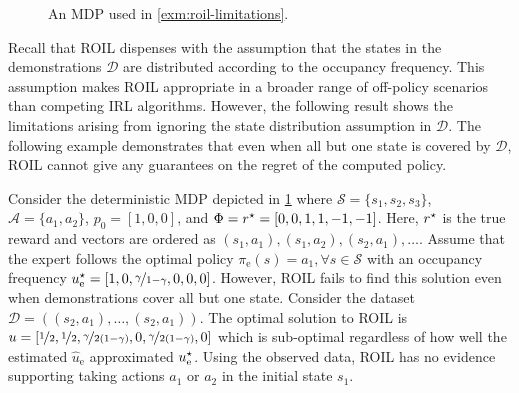 \begin{figure}
  \centering
{}
  \caption{An MDP used in \cref{exm:roil-limitations}.}
  \label{fig:roil-fail}
\end{figure}

Recall that ROIL dispenses with the assumption that the states in the demonstrations $\mathcal{D}$ are distributed according to the occupancy frequency. This assumption makes ROIL appropriate in a broader range of off-policy scenarios than competing IRL algorithms. However, the following result shows the limitations arising from ignoring the state distribution assumption in $\mathcal{D}$. The following example demonstrates that even when all but one state is covered by $\mathcal{D}$, ROIL cannot give any guarantees on the regret of the computed policy. 

\begin{example} \label{exm:roil-limitations}
Consider the deterministic MDP depicted in \cref{fig:roil-fail} where $\mathcal{S} = \{s_1, s_2, s_3\}$, $\mathcal{A} = \{a_1, a_2\}$, $p_0 = [1,0,0]$, and $\Phi = r^{\star} = [0,0,1,1,-1,-1]$. Here, $r^{\star}$ is the true reward and vectors are ordered as $(s_1,a_1), (s_1, a_2), (s_2,a_1), \dots $. Assume that the expert follows the optimal policy $\pi_{\mathrm{e}}(s) = a_1, \forall s\in \mathcal{S}$ with an occupancy frequency $u_{\mathrm{e}}^{\star}  = [1,0,\nicefrac{\gamma}{1-\gamma},0,0,0]$. However, ROIL fails to find this solution even when demonstrations cover all but one state. Consider the dataset $\mathcal{D} = ((s_2, a_1),  \dots, (s_2, a_1))$. The optimal solution to ROIL is $u = [\nicefrac{1}{2},\nicefrac{1}{2},\nicefrac{\gamma}{2(1-\gamma)},0,\nicefrac{\gamma}{2(1-\gamma)},0]$ which is sub-optimal regardless of how well the estimated $\hat{u}_{\mathrm{e}}$ approximated $u_{\mathrm{e}}^{\star} $. Using the observed data, ROIL has no evidence supporting taking actions $a_1$ or $a_2 $ in the initial state $s_1$.
\end{example} 

